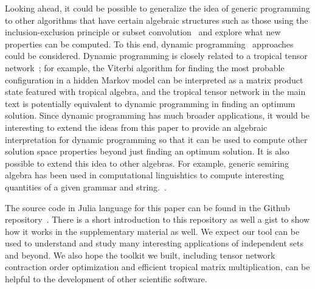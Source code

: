 \documentclass[onefignum, onetabnum]{siamart190516}
\newcommand{\<}{\langle}
\renewcommand{\>}{\rangle}
\newcounter{example}
\begin{document}
Looking ahead, it could be possible to generalize the idea of generic programming to other algorithms that have certain algebraic structures such as those using the inclusion-exclusion principle or subset convolution~\cite{Fomin2013} and explore what new properties can be computed.
To this end, dynamic programming~\cite{Courcelle1990, Fomin2013} approaches could be considered.
Dynamic programming is closely related to a tropical tensor network~\cite{Liu2021}; for example, the Viterbi algorithm for finding the most probable configuration in a hidden Markov model can be interpreted as a matrix product state featured with tropical algebra, and the tropical tensor network in the main text is potentially equivalent to dynamic programming in finding an optimum solution.
Since dynamic programming has much broader applications, it would be interesting to extend the ideas from this paper to provide an algebraic interpretation for dynamic programming so that it can be used to compute other solution space properties beyond just finding an optimum solution.
It is also possible to extend this idea to other algebras. For example, generic semiring algebra has been used in computational linguishtics to compute interesting quantities of a given grammar and string.~\cite{Goodman1999}.

The source code in Julia language for this paper can be found in the Github repository~\cite{GenericTensorNetworks}. 
There is a short introduction to this repository as well a gist to show how it works in the supplementary material as well.
We expect our tool can be used to understand and study many interesting applications of independent sets and beyond.
We also hope the toolkit we built, including tensor network contraction order optimization and efficient tropical matrix multiplication, can be helpful to the development of other scientific software.

\end{document}
